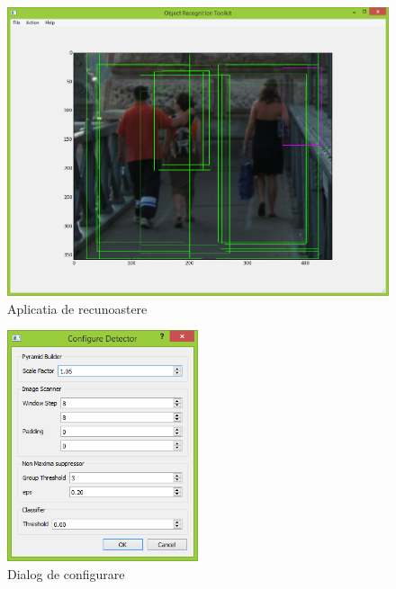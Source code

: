 \begin{figure}[h]
	\centering
		\includegraphics[width=1.00\textwidth]{imagini/aplicatia.png}
	\caption{Aplicatia de recunoastere}
	\label{fig:aplicatia}
\end{figure}

\begin{figure}[h]
	\centering
		\includegraphics[width=0.5\textwidth]{imagini/dialog_configurare.png}
	\caption{Dialog de configurare}
	\label{fig:dialog_configurare}
\end{figure}





%